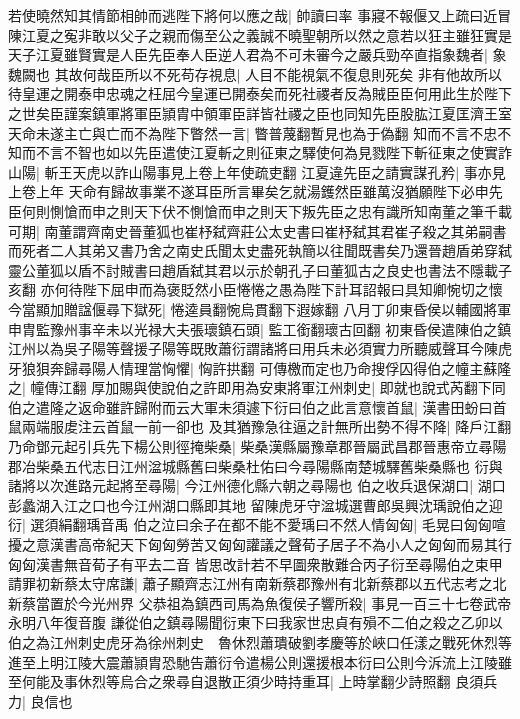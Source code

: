 若使曉然知其情節相帥而逃陛下將何以應之哉|{
	帥讀曰率}
事寢不報偃又上疏曰近冒陳江夏之寃非敢以父子之親而傷至公之義誠不曉聖朝所以然之意若以狂主雖狂實是天子江夏雖賢實是人臣先臣奉人臣逆人君為不可未審今之嚴兵勁卒直指象魏者|{
	象魏闕也}
其故何哉臣所以不死苟存視息|{
	人目不能視氣不復息則死矣}
非有他故所以待皇運之開泰申忠魂之枉屈今皇運已開泰矣而死社禝者反為賊臣臣何用此生於陛下之世矣臣謹案鎮軍將軍臣頴胄中領軍臣詳皆社禝之臣也同知先臣股肱江夏匡濟王室天命未遂主亡與亡而不為陛下瞥然一言|{
	瞥普蔑翻暫見也為于偽翻}
知而不言不忠不知而不言不智也如以先臣遣使江夏斬之則征東之驛使何為見戮陛下斬征東之使實詐山陽|{
	斬王天虎以詐山陽事見上卷上年使疏吏翻}
江夏違先臣之請實謀孔矜|{
	事亦見上卷上年}
天命有歸故事業不遂耳臣所言畢矣乞就湯鑊然臣雖萬沒猶願陛下必申先臣何則惻愴而申之則天下伏不惻愴而申之則天下叛先臣之忠有識所知南董之筆千載可期|{
	南董謂齊南史晉董狐也崔杼弑齊莊公太史書曰崔杼弑其君崔子殺之其弟嗣書而死者二人其弟又書乃舍之南史氏聞太史盡死執簡以往聞既書矣乃還晉趙盾弟穿弑靈公董狐以盾不討賊書曰趙盾弑其君以示於朝孔子曰董狐古之良史也書法不隱載子亥翻}
亦何待陛下屈申而為褒貶然小臣惓惓之愚為陛下計耳詔報曰具知卿惋切之懷今當顯加贈諡偃尋下獄死|{
	惓逵員翻惋烏貫翻下遐嫁翻}
八月丁卯東昏侯以輔國將軍申胄監豫州事辛未以光禄大夫張瓌鎮石頭|{
	監工銜翻瓌古回翻}
初東昏侯遣陳伯之鎮江州以為吳子陽等聲援子陽等既敗蕭衍謂諸將曰用兵未必須實力所聽威聲耳今陳虎牙狼狽奔歸尋陽人情理當恟懼|{
	恟許拱翻}
可傳檄而定也乃命搜俘囚得伯之幢主蘇隆之|{
	幢傳江翻}
厚加賜與使說伯之許即用為安東將軍江州刺史|{
	即就也說式芮翻下同}
伯之遣隆之返命雖許歸附而云大軍未須遽下衍曰伯之此言意懷首鼠|{
	漢書田蚡曰首鼠兩端服䖍注云首鼠一前一卻也}
及其猶豫急往逼之計無所出勢不得不降|{
	降戶江翻}
乃命鄧元起引兵先下楊公則徑掩柴桑|{
	柴桑漢縣屬豫章郡晉屬武昌郡晉惠帝立尋陽郡冶柴桑五代志日江州湓城縣舊曰柴桑杜佑曰今尋陽縣南楚城驛舊柴桑縣也}
衍與諸將以次進路元起將至尋陽|{
	今江州德化縣六朝之尋陽也}
伯之收兵退保湖口|{
	湖口彭蠡湖入江之口也今江州湖口縣即其地}
留陳虎牙守湓城選曹郎吳興沈瑀說伯之迎衍|{
	選須絹翻瑀音禹}
伯之泣曰余子在都不能不愛瑀曰不然人情匈匈|{
	毛晃曰匈匈喧擾之意漢書高帝紀天下匈匈勞苦又匈匈讙議之聲荀子居子不為小人之匈匈而易其行匈匈漢書無音荀子有平去二音}
皆思改計若不早圖衆散難合丙子衍至尋陽伯之束甲請罪初新蔡太守席謙|{
	蕭子顯齊志江州有南新蔡郡豫州有北新蔡郡以五代志考之北新蔡當置於今光州界}
父恭祖為鎮西司馬為魚復侯子響所殺|{
	事見一百三十七卷武帝永明八年復音腹}
謙從伯之鎮尋陽聞衍東下曰我家世忠貞有殞不二伯之殺之乙卯以伯之為江州刺史虎牙為徐州刺史　魯休烈蕭璝破劉孝慶等於峽口任漾之戰死休烈等進至上明江陵大震蕭頴胄恐馳告蕭衍令遣楊公則還援根本衍曰公則今泝流上江陵雖至何能及事休烈等烏合之衆尋自退散正須少時持重耳|{
	上時掌翻少詩照翻}
良須兵力|{
	良信也}
